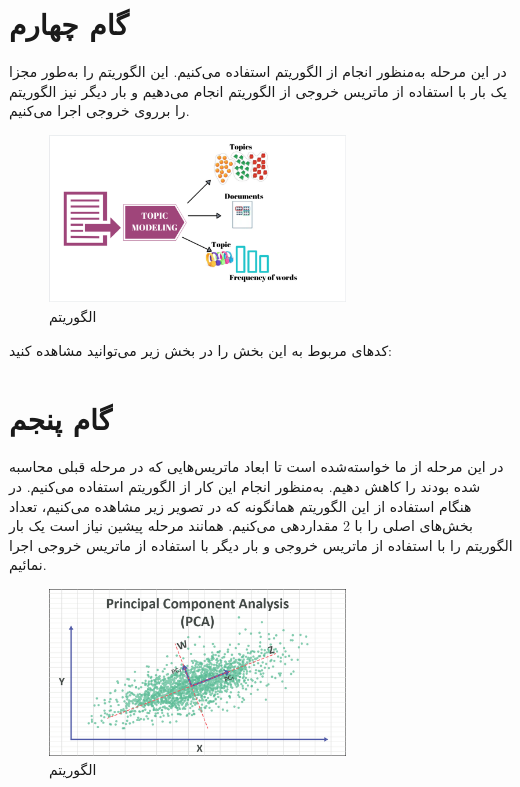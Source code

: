\documentclass{article}
\begin{document}
\lr{}

\newpage
\section{گام چهارم}
در این مرحله به‌منظور انجام  از الگوریتم  استفاده می‌کنیم. این الگوریتم را به‌طور مجزا یک بار با استفاده از ماتریس خروجی از الگوریتم  انجام می‌دهیم و بار دیگر نیز الگوریتم را برروی خروجی  اجرا می‌کنیم.
\begin{figure}[ht]
        \centering
        \includegraphics[width=0.7\textwidth]{step4-lda.png}
        \caption{الگوریتم }
        \label{fig:fig3}
\end{figure}

کدهای مربوط به این بخش را در بخش زیر می‌توانید مشاهده کنید:
\lr{}
    
\newpage
\section{گام پنجم}
در این مرحله از ما خواسته‌شده است تا ابعاد ماتریس‌هایی که در مرحله قبلی محاسبه شده بودند را کاهش دهیم. به‌منظور انجام این کار از الگوریتم  استفاده می‌کنیم. در هنگام استفاده از این الگوریتم همانگونه که در تصویر زیر مشاهده می‌کنیم، تعداد بخش‌های اصلی را با 2 مقداردهی می‌کنیم. همانند مرحله پیشین نیاز است یک بار الگوریتم را با استفاده از ماتریس خروجی  و بار دیگر با استفاده از ماتریس خروجی  اجرا نمائیم.
\begin{figure}[ht]
        \centering
        \includegraphics[width=0.7\textwidth]{step5-pca.png}
        \caption{الگوریتم }
        \label{fig:fig4}
\end{figure}
\end{document}
